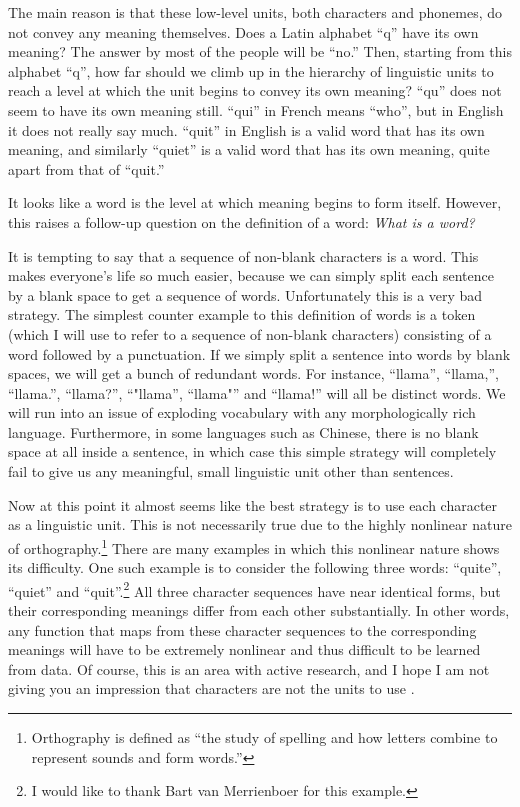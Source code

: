 \documentclass{report}
\begin{document}
The main reason is that these low-level units, both characters and phonemes, do
not convey any meaning themselves. Does a Latin alphabet ``q'' have its own
meaning? The answer by most of the people will be ``no.'' Then, starting from
this alphabet ``q'', how far should we climb up in the hierarchy of linguistic
units to reach a level at which the unit begins to convey its own meaning?
``qu'' does not seem to have its own meaning still. ``qui'' in French means
``who'', but in English it does not really say much. ``quit'' in English is a
valid word that has its own meaning, and similarly ``quiet'' is a valid word
that has its own meaning, quite apart from that of ``quit.''

It looks like a word is the level at which meaning begins to form itself.
However, this raises a follow-up question on the definition of a word: {\em What
is a word?}

It is tempting to say that a sequence of non-blank characters is a word. This
makes everyone's life so much easier, because we can simply split each sentence
by a blank space to get a sequence of words. Unfortunately this is a very bad
strategy. The simplest counter example to this definition of words is a token
(which I will use to refer to a sequence of non-blank characters) consisting of
a word followed by a punctuation. If we simply split a sentence into words by
blank spaces, we will get a bunch of redundant words. For instance, ``llama'',
``llama,'', ``llama.'', ``llama?'', ``"llama'', ``llama"'' and ``llama!'' will
all be distinct words. We will run into an issue of exploding vocabulary with
any morphologically rich language. Furthermore, in some languages such as
Chinese, there is no blank space at all inside a sentence, in which case this
simple strategy will completely fail to give us any meaningful, small linguistic
unit other than sentences.

Now at this point it almost seems like the best strategy is to use each
character as a linguistic unit. This is not necessarily true due to the highly
nonlinear nature of orthography.\footnote{
    Orthography is defined as ``the study of spelling and how letters combine to
    represent sounds and form words.''
} There are many examples in which this nonlinear nature shows its difficulty.
One such example is to consider the following three words: ``quite'', ``quiet''
and ``quit''.\footnote{
    I would like to thank Bart van Merrienboer for this example.
}
All three character sequences have near identical forms, but their corresponding
meanings differ from each other substantially. In other words, any function that
maps from these character sequences to the corresponding meanings will have to
be extremely nonlinear and thus difficult to be learned from data. Of course,
this is an area with active research, and I hope I am not giving you an
impression that characters are not the units to use
\citep[see, e.g.,][]{kim2015character}.
\end{document}
